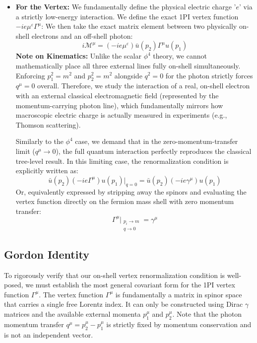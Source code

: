\begin{itemize}
    \item \textbf{For the Vertex:}
          We fundamentally define the physical electric charge '$e$' via a strictly low-energy interaction. We define the exact 1PI vertex function $-ie\mu^\varepsilon \Gamma^\mu$:
          We then take the exact matrix element between two physically on-shell electrons and an off-shell photon:
          \[ i\mathcal{M}^\mu = (-ie\mu^\varepsilon) \bar{u}(p_2) \Gamma^\mu u(p_1) \]
          \textbf{Note on Kinematics:} Unlike the scalar $\phi^4$ theory, we cannot mathematically place all three external lines fully on-shell simultaneously. Enforcing $p_1^2 = m^2$ and $p_2^2 = m^2$ alongside $q^2 = 0$ for the photon strictly forces $q^\mu = 0$ overall. Therefore, we study the interaction of a real, on-shell electron with an external classical electromagnetic field (represented by the momentum-carrying photon line), which fundamentally mirrors how macroscopic electric charge is actually measured in experiments (e.g., Thomson scattering).

          Similarly to the $\phi^4$ case, we demand that in the zero-momentum-transfer limit ($q^\mu \to 0$), the full quantum interaction perfectly reproduces the classical tree-level result. In this limiting case, the renormalization condition is explicitly written as:
          \[ \bar{u}(p_2) (-ie \Gamma^\mu) u(p_1) \Big|_{q=0} = \bar{u}(p_2) (-ie \gamma^\mu) u(p_1) \]
          Or, equivalently expressed by stripping away the spinors and evaluating the vertex function directly on the fermion mass shell with zero momentum transfer:
          \[ \Gamma^\mu \Big|_{\substack{p_i \to m \\ q \to 0}} = \gamma^\mu \]
\end{itemize}

\subsection{Gordon Identity}

To rigorously verify that our on-shell vertex renormalization condition is well-posed, we must establish the most general covariant form for the 1PI vertex function $\Gamma^\mu$. The vertex function $\Gamma^\mu$ is fundamentally a matrix in spinor space that carries a single free Lorentz index. It can only be constructed using Dirac $\gamma$ matrices and the available external momenta $p_1^\mu$ and $p_2^\mu$. Note that the photon momentum transfer $q^\mu = p_2^\mu - p_1^\mu$ is strictly fixed by momentum conservation and is not an independent vector.

